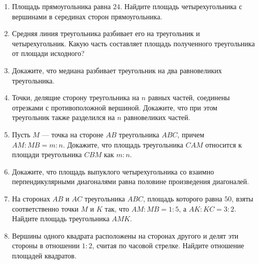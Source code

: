 \documentclass[12pt, a4paper]{article}
\begin{document}
	
	\begin{enumerate}
		\item Площадь прямоугольника равна $24$. Найдите площадь четырехугольника с вершинами в серединах сторон прямоугольника.
		\item Средняя линия треугольника разбивает его на треугольник и четырехугольник. Какую часть составляет площадь полученного треугольника от площади исходного?
		\item Докажите, что медиана разбивает треугольник на два равновеликих треугольника.
		\item Точки, делящие сторону треугольника на $n$ равных частей, соединены отрезками с противоположной вершиной. Докажите, что при этом треугольник также разделился на $n$ равновеликих частей.
		\item Пусть $M$ — точка на стороне $AB$ треугольника $ABC$, причем $AM : MB = m : n$. Докажите, что площадь треугольника $CAM$ относится к площади треугольника $CBM$ как $m : n$.
		\item Докажите, что площадь выпуклого четырехугольника со взаимно перпендикулярными диагоналями равна половине произведения диагоналей.
		\item На сторонах $AB$ и $AC$ треугольника $ABC$, площадь которого равна $50$, взяты соответственно точки $M$ и $K$ так, что $AM : MB = 1 : 5$, а $AK : KC = 3 : 2$. Найдите площадь треугольника $AMK$.
		\item Вершины одного квадрата расположены на сторонах другого и делят эти стороны в отношении $1 : 2$, считая по часовой стрелке. Найдите отношение площадей квадратов.
	\end{enumerate}
\end{document}
